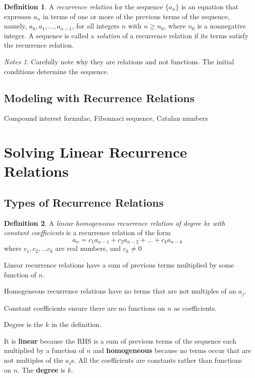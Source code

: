 \documentclass[11pt]{book} %
\theoremstyle {definition}
\newtheorem {definition}{Definition}[section]
\theoremstyle {remark}
\newtheorem*{notes}{Notes}
\begin{document}
\begin{definition}
A \textit{recurrence relation} for the sequence $\{a_n\}$ is an equation that expresses $a_n$ in terms of one or more of the previous terms of the sequence, namely, $a_0,a_1, \dots ,a_{n-1}$, for all integers $n$ with $n \ge n_0$, where $n_0$ is a nonnegative integer. A sequence is called a \textit{solution} of a recurrence relation if its terms satisfy the recurrence relation.
\end{definition}

\begin{notes}
Carefully note why they are relations and not functions. The initial conditions determine the sequence.
\end{notes}

    \subsection {Modeling with Recurrence Relations}
Compound interest formulae, Fibonnaci sequence, Catalan numbers
    
\section {Solving Linear Recurrence Relations}
  \subsection {Types of Recurrence Relations}

    \begin{definition}
    A \textit{linear homogeneous recurrence relation of degree ke with constant coefficients} is a recurrence relation of the form
    $$ a_n=c_1a_{n-1} + c_2a_{n-2}+ \dots + c_ka_{n-k}$$
    where $c_1, c_2, \dots c_k$ are real numbers, and $c_k \neq 0$
    
    \end{definition}

Linear recurrence relations have a sum of previous terms multiplied by some function of $n$.

Homogeneous recurrence relations have no terms that are not multiples of an $a_j$.

Constant coefficients ensure there are no functions on $n$ as coefficients.

Degree is the $k$ in the definition.


    It is \textbf{linear} because the RHS is a sum of previous terms of the sequence each multiplied by a function of $n$ and \textbf{homogeneous} because no terms occur that are not multiples of the $a_j$s. All the coefficients are constants rather than functions on $n$. The \textbf{degree} is $k$. 
\end{document}
